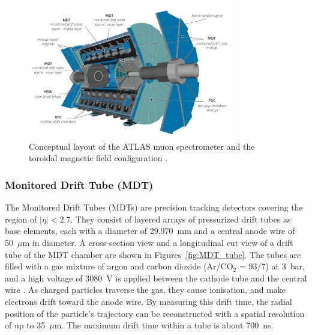 \begin{figure}[htbp]
  \centering
  \includegraphics[width=0.8\textwidth]{figs/chapter2/muon_system.png}
  \caption{Conceptual layout of the ATLAS muon spectrometer and the toroidal magnetic field configuration \cite{ATLASDetector2008}.}
  \label{fig:muon_system}
\end{figure}

\subsubsection{Monitored Drift Tube (MDT)}
The Monitored Drift Tubes (MDTs) are precision tracking detectors covering the region of $|\eta| < 2.7$. They consist of layered arrays of pressurized drift tubes as base elements, each with a diameter of 29.970~mm and a central anode wire of 50~$\mu$m in diameter. A cross-section view and a longitudinal cut view of a drift tube of the MDT chamber are shown in Figures~\ref{fig:MDT_tube}. The tubes are filled with a gas mixture of argon and carbon dioxide (Ar/CO$_2$ = 93/7) at 3~bar, and a high voltage of 3080~V is applied between the cathode tube and the central wire \cite{ATLASDetector2008}. As charged particles traverse the gas, they cause ionisation, and make electrons drift toward the anode wire. By measuring this drift time, the radial position of the particle's trajectory can be reconstructed with a spatial resolution of up to 35~$\mu$m. The maximum drift time within a tube is about 700~ns.

